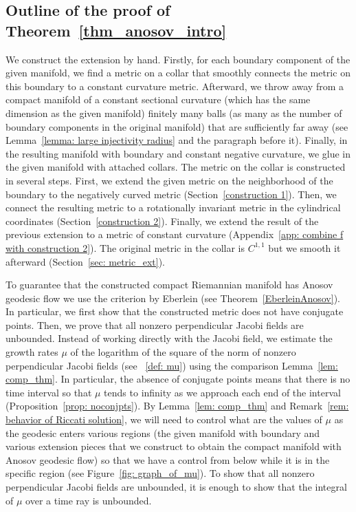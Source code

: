 \documentclass[10pt]{amsart}
\theoremstyle{definition}
\renewcommand{\>}{{\rangle}}
\newcommand{\<}{{\langle}}
\begin{document}
\subsection{Outline of the proof of Theorem~\ref{thm_anosov_intro}}\label{outline of the proof} We construct the extension by hand. Firstly, for each boundary component of the given manifold, we find a metric on a collar that smoothly connects the metric on this boundary to a constant curvature metric. Afterward, we throw away from a compact manifold of a constant sectional curvature (which has the same dimension as the given manifold) finitely many balls (as many as the number of boundary components in the original manifold) that are sufficiently far away (see Lemma~\ref{lemma: large injectivity radius} and the paragraph before it). Finally, in the resulting manifold with boundary and constant negative curvature, we glue in the given manifold with attached collars. The metric on the collar is constructed in several steps. First, we extend the given metric on the neighborhood of the boundary to the negatively curved metric (Section~\ref{construction 1}). Then, we connect the resulting metric to a rotationally invariant metric in the cylindrical coordinates (Section~\ref{construction 2}). Finally, we extend the result of the previous extension to a metric of constant curvature (Appendix~\ref{app: combine f with construction 2}). The original metric in the collar is $C^{1,1}$ but we smooth it afterward (Section~\ref{sec: metric_ext}).

To guarantee that the constructed compact Riemannian manifold has Anosov geodesic flow we use the criterion by Eberlein (see Theorem~\ref{EberleinAnosov}). In particular, we first show that the constructed metric does not have conjugate points. Then, we prove that all nonzero perpendicular Jacobi fields are unbounded. Instead of working directly with the Jacobi field, we estimate the growth rates $\mu$ of the logarithm of the square of the norm of nonzero perpendicular Jacobi fields (see ~\eqref{def: mu}) using the comparison Lemma~\ref{lem: comp_thm}. In particular, the absence of conjugate points means that there is no time interval so that $\mu$ tends to infinity as we approach each end of the interval (Proposition~\ref{prop: noconjpts}). By Lemma~\ref{lem: comp_thm} and Remark~\ref{rem: behavior of Riccati solution}, we will need to control what are the values of $\mu$ as the geodesic enters various regions (the given manifold with boundary and various extension pieces that we construct to obtain the compact manifold with Anosov geodesic flow) so that we have a control from below while it is in the specific region (see Figure~\ref{fig: graph_of_mu}). To show that all nonzero perpendicular Jacobi fields are unbounded, it is enough to show that the integral of $\mu$ over a time ray is unbounded.
\end{document}
